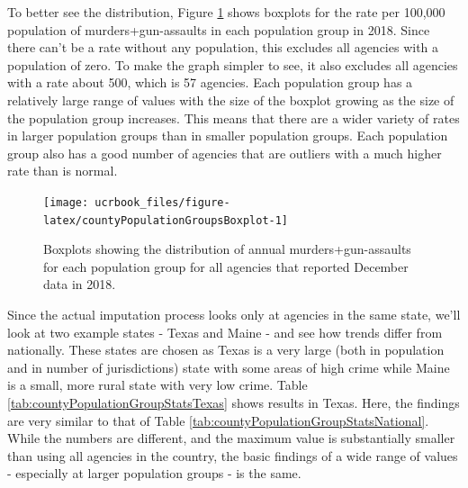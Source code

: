 \documentclass[
  12pt,
  openany]{book}
\begin{document}
To better see the distribution, Figure \ref{fig:countyPopulationGroupsBoxplot} shows boxplots for the rate per 100,000 population of murders+gun-assaults in each population group in 2018. Since there can't be a rate without any population, this excludes all agencies with a population of zero. To make the graph simpler to see, it also excludes all agencies with a rate about 500, which is 57 agencies. Each population group has a relatively large range of values with the size of the boxplot growing as the size of the population group increases. This means that there are a wider variety of rates in larger population groups than in smaller population groups. Each population group also has a good number of agencies that are outliers with a much higher rate than is normal.

\begin{figure}

{\centering \texttt{[image: ucrbook\_files/figure-latex/countyPopulationGroupsBoxplot-1]} 

}

\caption{Boxplots showing the distribution of annual murders+gun-assaults for each population group for all agencies that reported December data in 2018.}\label{fig:countyPopulationGroupsBoxplot}
\end{figure}

Since the actual imputation process looks only at agencies in the same state, we'll look at two example states - Texas and Maine - and see how trends differ from nationally. These states are chosen as Texas is a very large (both in population and in number of jurisdictions) state with some areas of high crime while Maine is a small, more rural state with very low crime. Table \ref{tab:countyPopulationGroupStatsTexas} shows results in Texas. Here, the findings are very similar to that of Table \ref{tab:countyPopulationGroupStatsNational}. While the numbers are different, and the maximum value is substantially smaller than using all agencies in the country, the basic findings of a wide range of values - especially at larger population groups - is the same.
\end{document}
